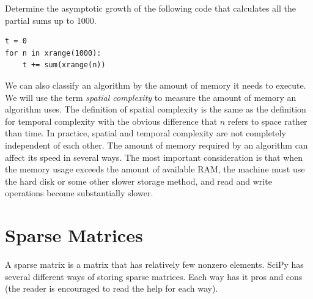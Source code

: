 \begin{problem}
Determine the asymptotic growth of the following code that calculates all the partial sums
up to 1000.
\begin{lstlisting}
t = 0
for n in xrange(1000):
    t += sum(xrange(n))
\end{lstlisting}
\end{problem}

We can also classify an algorithm by the amount of memory it needs to execute.  We will use the term \emph{spatial complexity} to measure the amount of memory an algorithm uses.  The definition of spatial complexity is the same as the definition for temporal complexity with the obvious difference that $n$ refers to space rather than time.
In practice, spatial and temporal complexity are not completely independent of each
other. The amount of memory required by an algorithm can affect its speed in several
ways. The most important consideration is that when the memory usage exceeds the amount
of available RAM, the machine must use the hard disk or some other slower storage
method, and read and write operations become substantially slower.

\section*{Sparse Matrices}
A sparse matrix is a matrix that has relatively few nonzero elements.
SciPy has several different ways of storing sparse matrices.
Each way has it pros and cons (the reader is encouraged to read the help for each way).

